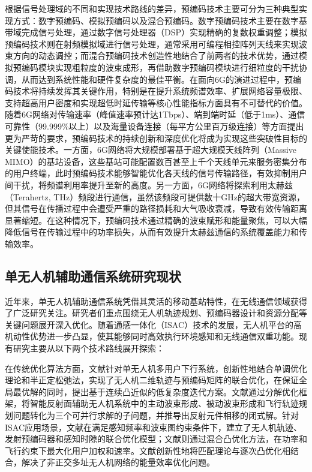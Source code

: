 \documentclass{article}
\begin{document}
根据信号处理域的不同和实现技术路线的差异，预编码技术主要可分为三种典型实现方式：数字预编码、模拟预编码以及混合预编码\cite{busari2017millimeter}。数字预编码技术主要在数字基带域完成信号处理，通过数字信号处理器（DSP）实现精确的复数权重调整；模拟预编码技术则在射频模拟域进行信号处理，通常采用可编程相控阵列天线来实现波束方向的动态调控；而混合预编码技术创造性地结合了前两者的技术优势，通过模拟预编码模块实现粗粒度的波束成形，再借助数字预编码模块进行细粒度的干扰协调，从而达到系统性能和硬件复杂度的最佳平衡。在面向6G的演进过程中，预编码技术将持续发挥其关键作用，特别是在提升系统频谱效率、扩展网络容量极限、支持超高用户密度和实现超低时延传输等核心性能指标方面具有不可替代的价值\cite{yan2020hybrid}。随着6G网络对传输速率（峰值速率预计达1Tbps）、端到端时延（低于1ms）、通信可靠性（99.999\%以上）以及海量设备连接（每平方公里百万级连接）等方面提出更为严苛的要求，预编码技术的持续创新和深度优化将成为实现这些突破性目标的关键使能技术。一方面，6G网络将大规模部署基于超大规模天线阵列（Massive MIMO）的基站设备，这些基站可能配置数百甚至上千个天线单元来服务密集分布的用户终端，此时预编码技术能够智能优化各天线的信号传输路径，有效抑制用户间干扰，将频谱利用率提升至新的高度。另一方面，6G网络将探索利用太赫兹（Terahertz, THz）频段进行通信，虽然该频段可提供数十GHz的超大带宽资源，但其信号在传播过程中会遭受严重的路径损耗和大气吸收衰减，导致有效传输距离显著缩短。在这种情况下，预编码技术通过精确的波束赋形和能量聚焦，可以大幅降低信号在传输过程中的功率损失，从而有效提升太赫兹通信的系统覆盖能力和传输效率。

  \subsection{单无人机辅助通信系统研究现状}

  近年来，单无人机辅助通信系统凭借其灵活的移动基站特性，在无线通信领域获得了广泛研究关注。研究者们重点围绕无人机轨迹规划、预编码器设计和资源分配等关键问题展开深入优化。随着通感一体化（ISAC）技术的发展，无人机平台的高机动性优势进一步凸显，使其能够同时高效执行环境感知和无线通信双重功能。现有研究主要从以下两个技术路线展开探索：

  在传统优化算法方面，文献\cite{xu2020multiuser}针对单无人机多用户下行系统，创新性地结合单调优化理论和半正定松弛法，实现了无人机二维轨迹与预编码矩阵的联合优化，在保证全局最优解的同时，提出基于连续凸近似的低复杂度迭代方案。文献\cite{ge2020joint}通过分解优化框架，将智能反射面辅助无人机系统中的主动波束形成、被动波束形成和飞行轨迹规划问题转化为三个可并行求解的子问题，并推导出反射元件相移的闭式解。针对ISAC应用场景，文献\cite{meng2022uav}在满足感知频率和波束图约束条件下，建立了无人机轨迹、发射预编码器和感知时隙的联合优化模型；文献\cite{lyu2022joint}则通过混合凸优化方法，在功率和飞行约束下最大化用户加权和速率。文献\cite{li2020joint}创新性地将匹配理论与逐次凸优化相结合，解决了非正交多址无人机网络的能量效率优化问题。
\end{document}
